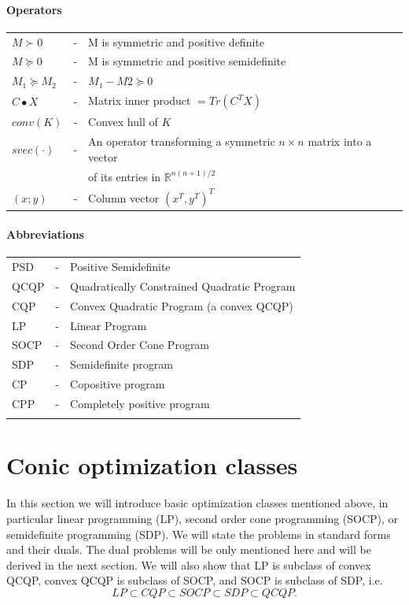 \documentclass[12pt]{book}
\theoremstyle{definition}
\begin{document}
\subsubsection{Operators}
\begin{tabular}{lcl}
$M\succ 0$ &-& M is symmetric and positive definite \\
$M\succeq 0$ &-& M is symmetric and positive semidefinite \\
$M_1 \succeq M_2$ &-& $M_1 - M2\succeq 0$ \\
$C\bullet X$ &-& Matrix inner product $=Tr(C^TX)$ \\

$conv(K)$ &-& Convex hull of $K$ \\
$svec(\cdot)$ &-& An operator transforming a symmetric $n\times n$  matrix into a vector \\& &  of its entries in $\mathbb{R}^{n(n+1)/2}$ \\
$(x;y)$ &-& Column vector $(x^T,y^T)^T$
\end{tabular}

\subsubsection{Abbreviations}
\begin{tabular}{lcl}

PSD &-& Positive Semidefinite \\

QCQP &-& Quadratically Constrained Quadratic Program \\
CQP &-& Convex Quadratic Program (a convex QCQP) \\
LP &-& Linear Program \\
SOCP &-& Second Order Cone Program \\
SDP &-& Semidefinite program \\
CP &-& Copositive program \\
CPP &-& Completely positive program \\
& & \\ 
\end{tabular}





\chapter{Conic optimization classes}
\label{ConicOptClasses}

In this section we will introduce basic optimization classes mentioned above, in particular  linear programming (LP), second order cone programming  (SOCP), or semidefinite programming (SDP). We will state the problems in standard forms and their duals. The dual problems will be only mentioned here and will be derived in the next section. We will also show that LP is subclass of convex QCQP, convex QCQP is subclass of SOCP, and SOCP is subclass of SDP, i.e.
\begin{equation*}
LP\subset CQP \subset SOCP \subset SDP \subset QCQP .
\end{equation*}
\end{document}
